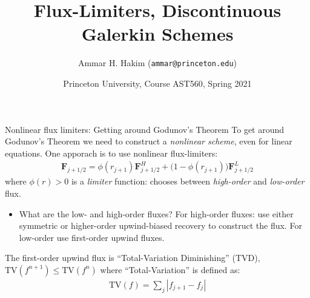 \documentclass[aspectratio=169]{beamer}
\title[{\tt }]{Flux-Limiters, Discontinuous Galerkin Schemes}%
\author[https://ast560.rtfd.io]%
{Ammar H. Hakim ({\tt ammar@princeton.edu}) \inst{1}}%
\institute[PPPL]
{ \inst{1} Princeton Plasma Physics Laboratory, Princeton, NJ %
}
\date[3/30/2021]{Princeton University, Course AST560, Spring 2021}
\newcommand{\mypause}{\pause}
\newcommand{\mvec}[1]{\mathbf{#1}}
\begin{document}
\begin{frame}[plain]
  \titlepage
\end{frame}

\begin{frame}{Nonlinear flux limiters: Getting around Godunov's Theorem}
  \small%
  To get around Godunov's Theorem we need to construct a
  \emph{nonlinear scheme}, even for linear equations. One apporach is
  to use nonlinear flux-limiters:
  \begin{align*}
    \mvec{F}_{j+1/2} = \phi(r_{j+1}) \mvec{F}^H_{j+1/2} + \big(1-\phi(r_{j+1})\big) \mvec{F}^L_{j+1/2}
  \end{align*}
  where $\phi(r)>0$ is a \emph{limiter} function: chooses between
  \emph{high-order} and \emph{low-order} flux.
  \mypause%
  \begin{itemize} 
  \item What are the low- and high-order fluxes? For high-order
    fluxes: use either symmetric or higher-order upwind-biased
    recovery to construct the flux. For low-order use first-order
    upwind fluxes.
  \end{itemize}
  \mypause%
  The first-order upwind flux is ``Total-Variation Diminishing''
  (TVD), $\textrm{TV}(f^{n+1}) \le \textrm{TV}(f^n)$ where
  ``Total-Variation'' is defined as:
  \begin{align*}
    \textrm{TV}(f) = \sum_j | f_{j+1} - f_{j} |
  \end{align*}
\end{frame}
\end{document}
